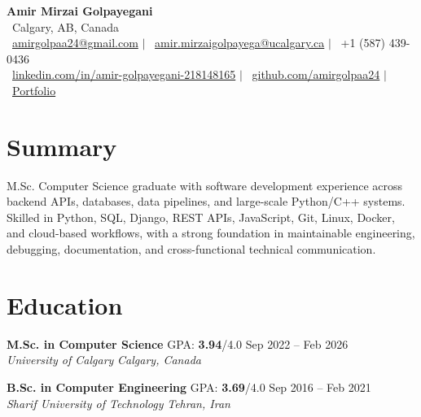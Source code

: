 \documentclass[a4paper,10pt]{article}
\newcommand{\resumeEducationSubheading}[5]{
    \textbf{#1} \hfill #2 \hfill #3 \\
    \textit{#4} \hfill \textit{#5}
}
\begin{document}

\begin{center}
    {\LARGE \textbf{Amir Mirzai Golpayegani}} \\[0.25em]
    \faMapMarker*~Calgary, AB, Canada \\[0.25em]
    \faEnvelope~\href{mailto:amirgolpaa24@gmail.com}{amirgolpaa24@gmail.com}
    $|$
    \faEnvelope~\href{mailto:amir.mirzaigolpayega@ucalgary.ca}{amir.mirzaigolpayega@ucalgary.ca}
    $|$
    \faPhone*~+1 (587) 439-0436 \\[0.25em]
    \faLinkedin~\href{https://linkedin.com/in/amir-golpayegani-218148165}{linkedin.com/in/amir-golpayegani-218148165}
    $|$
    \faGithub~\href{https://github.com/amirgolpaa24}{github.com/amirgolpaa24}
    $|$
    \faGlobe~\href{https://amir-portfolio-navy.vercel.app/}{Portfolio}
\end{center}


\section*{Summary}

M.Sc. Computer Science graduate with software development experience across backend APIs, databases, data pipelines, and large-scale Python/C++ systems. Skilled in Python, SQL, Django, REST APIs, JavaScript, Git, Linux, Docker, and cloud-based workflows, with a strong foundation in maintainable engineering, debugging, documentation, and cross-functional technical communication.


\section*{Education}

\resumeEducationSubheading
{M.Sc. in Computer Science}
{GPA: \textbf{3.94}/4.0}
{Sep 2022 -- Feb 2026}
{University of Calgary}
{Calgary, Canada}

\vspace{0.35em}

\resumeEducationSubheading
{B.Sc. in Computer Engineering}
{GPA: \textbf{3.69}/4.0}
{Sep 2016 -- Feb 2021}
{Sharif University of Technology}
{Tehran, Iran}

\end{document}
